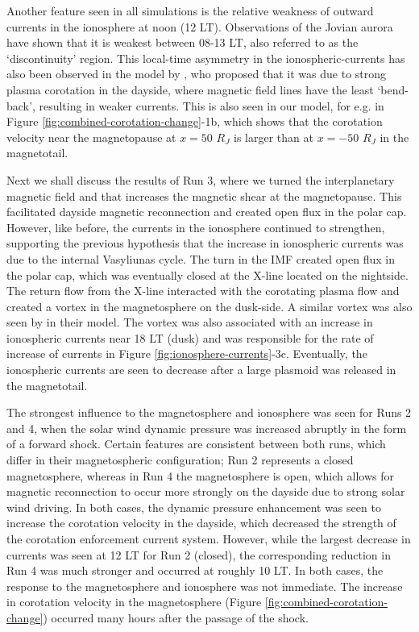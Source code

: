 Another feature seen in all simulations is the relative weakness of outward currents in the ionosphere at noon (12 LT). Observations of the Jovian aurora have shown that it is weakest between 08-13 LT, also referred to as the `discontinuity' region. This local-time asymmetry in the ionospheric-currents has also been observed in the model by , who proposed that it was due to strong plasma corotation in the dayside, where magnetic field lines have the least `bend-back', resulting in weaker currents. This is also seen in our model, for e.g. in Figure \ref{fig:combined-corotation-change}-1b, which shows that the corotation velocity near the magnetopause at $x=50$ $R_J$ is larger than at $x=-50$ $R_J$ in the magnetotail. 

Next we shall discuss the results of Run 3, where we turned the interplanetary magnetic field and that increases the magnetic shear at the magnetopause. This facilitated dayside magnetic reconnection and created open flux in the polar cap. However, like before, the currents in the ionosphere continued to strengthen, supporting the previous hypothesis that the increase in ionospheric currents was due to the internal Vasyliunas cycle. The turn in the IMF created open flux in the polar cap, which was eventually closed at the X-line located on the nightside. The return flow from the X-line interacted with the corotating plasma flow and created a vortex in the magnetosphere on the dusk-side. A similar vortex was also seen by \cite{Fukazawa2006a} in their model. The vortex was also associated with an increase in ionospheric currents near 18 LT (dusk) and was responsible for the rate of increase of currents in Figure \ref{fig:ionosphere-currents}-3c. Eventually, the ionospheric currents are seen to decrease after a large plasmoid was released in the magnetotail.

The strongest influence to the magnetosphere and ionosphere was seen for Runs 2 and 4, when the solar wind dynamic pressure was increased abruptly in the form of a forward shock. Certain features are consistent between both runs, which differ in their magnetospheric configuration; Run 2 represents a closed magnetosphere, whereas in Run 4 the magnetosphere is open, which allows for magnetic reconnection to occur more strongly on the dayside due to strong solar wind driving. In both cases, the dynamic pressure enhancement was seen to increase the corotation velocity in the dayside, which decreased the strength of the corotation enforcement current system. However, while the largest decrease in currents was seen at 12 LT for Run 2 (closed), the corresponding reduction in Run 4 was much stronger and occurred at roughly 10 LT. In both cases, the response to the magnetosphere and ionosphere was not immediate. The increase in corotation velocity in the magnetosphere (Figure \ref{fig:combined-corotation-change}) occurred many hours after the passage of the shock. 

